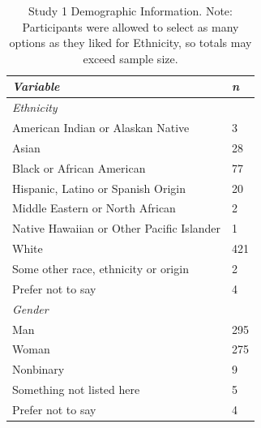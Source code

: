 \documentclass[12pt,]{article}
\begin{document}
\begin{table}[ht]
    \centering
    \begin{tabular}{l l}
        \toprule
        \emph{Variable} & \emph{n} \\
        \midrule
        \emph{Ethnicity} &  \\
        \hspace{1em} American Indian or Alaskan Native & 3 \\
        \hspace{1em} Asian & 28 \\
        \hspace{1em} Black or African American & 77 \\
        \hspace{1em} Hispanic, Latino or Spanish Origin & 20 \\
        \hspace{1em} Middle Eastern or North African& 2 \\
        \hspace{1em} Native Hawaiian or Other Pacific Islander & 1 \\ 
        \hspace{1em} White & 421 \\ 
        \hspace{1em} Some other race, ethnicity or origin & 2 \\ 
        \hspace{1em} Prefer not to say & 4 \\ 
      \emph{Gender} & \\ 
      \hspace{1em} Man & 295 \\
         \hspace{1em} Woman & 275 \\
         \hspace{1em} Nonbinary & 9 \\
         \hspace{1em} Something not listed here & 5 \\
         \hspace{1em} Prefer not to say & 4 \\
        \bottomrule
    \end{tabular}
    \caption{Study 1 Demographic Information. Note: Participants were allowed to select as many options as they liked for Ethnicity, so totals may exceed sample size. }
    \label{demo1}
\end{table}
\end{document}

